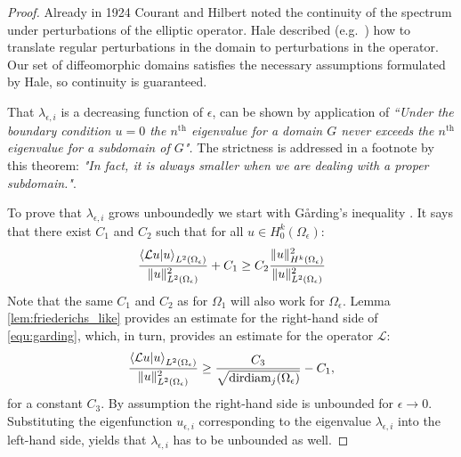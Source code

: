 \begin{proof}
  Already in 1924 Courant and Hilbert \cite[Vol I. Chapter V. Paragraph 13]{courant_methods_2008} noted the continuity of the spectrum under perturbations of the elliptic operator. Hale described (e.g.\ \cite{hale_eigenvalues_2005}) how to translate regular perturbations in the domain to perturbations in the operator. Our set of diffeomorphic domains satisfies the necessary assumptions formulated by Hale, so continuity is guaranteed.

  That $\lambda_{\epsilon, i}$ is a decreasing function of $\epsilon$, can be shown by application of \cite[Vol I, Chapter  VI, paragraph 2, Theorem 3]{courant_methods_2008} \emph{``Under the boundary condition $u = 0$ the $n^\text{th}$ eigenvalue for a domain $G$ never exceeds the $n^\text{th}$ eigenvalue for a subdomain of $G$".} The strictness is addressed in a footnote by this theorem: \emph{"In fact, it is always smaller when we are dealing with a proper subdomain."}.

  To prove that $\lambda_{\epsilon, i}$ grows unboundedly we start with Gårding's inequality \cite[Section 9.2.3]{renardy_introduction_2004}. It says that there exist $C_1$ and $C_2$ such that for all $u \in H^k_0(\Omega_\epsilon)$:
  \begin{equation}\label{equ:garding}
    \frac{\bra{\mathcal{L}u}\ket{u}_{L^2(\Omega_\epsilon)}}{\|u\|_{L^2(\Omega_\epsilon)}^2} + C_1 \geq C_2 \frac{\|u\|_{H^k(\Omega_\epsilon)}^2}{\|u\|_{L^2(\Omega_\epsilon)}^2}
  \end{equation}
  Note that the same $C_1$ and $C_2$ as for $\Omega_1$ will also work for $\Omega_\epsilon$. Lemma \ref{lem:friederichs_like} provides an estimate for the right-hand side of \eqref{equ:garding}, which, in turn, provides an estimate for the operator $\mathcal{L}$:
  $$
    \frac{\bra{\mathcal{L}u}\ket{u}_{L^2(\Omega_\epsilon)}}{\|u\|_{L^2(\Omega_\epsilon)}^2} \geq \frac{C_3}{\sqrt{\operatorname{dirdiam}_j(\Omega_\epsilon)}} - C_1\text{,}
  $$
  for a constant $C_3$. By assumption the right-hand side is unbounded for $\epsilon \to 0$. Substituting the eigenfunction $u_{\epsilon, i}$ corresponding to the eigenvalue $\lambda_{\epsilon, i}$ into the left-hand side, yields that $\lambda_{\epsilon, i}$ has to be unbounded as well.
\end{proof}


